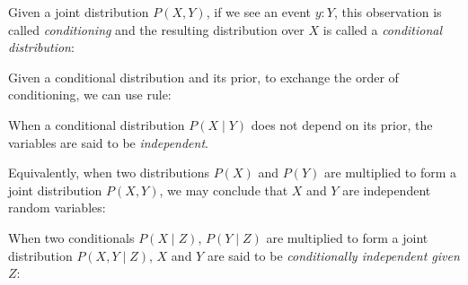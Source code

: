 \documentclass{article}
\begin{document}
Given a joint distribution $P(X, Y)$, if we see an event $y: Y$, this observation is called \textit{conditioning} and the resulting distribution over $X$ is called a \textit{conditional distribution}:


\begin{prooftree}
\end{prooftree}

Given a conditional distribution and its prior, to exchange the order of conditioning, we can use \citet{bayes1763essay} rule:

\begin{prooftree}
\end{prooftree}

When a conditional distribution $P(X \mid Y)$ does not depend on its prior, the variables are said to be \textit{independent}.

\begin{prooftree}
\end{prooftree}


Equivalently, when two distributions $P(X)$ and $P(Y)$ are multiplied to form a joint distribution $P(X, Y)$, we may conclude that $X$ and $Y$ are independent random variables:

\begin{prooftree}
\end{prooftree}

When two conditionals $P(X \mid Z)$, $P(Y \mid Z)$ are multiplied to form a joint distribution $P(X, Y \mid Z)$, $X$ and $Y$ are said to be \textit{conditionally independent given $Z$}:

\begin{prooftree}
\end{prooftree}
\end{document}
